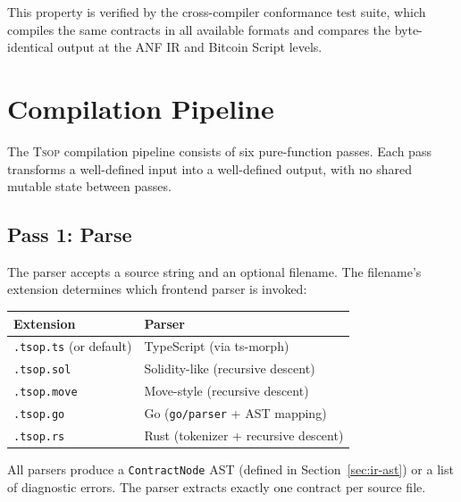\documentclass[11pt,a4paper]{article}
\newcommand{\tsop}{\textsc{Tsop}}
\begin{document}
This property is verified by the cross-compiler conformance test suite,
which compiles the same contracts in all available formats and compares
the byte-identical output at the ANF IR and Bitcoin Script levels.

\section{Compilation Pipeline}
\label{sec:pipeline}

The \tsop{} compilation pipeline consists of six pure-function passes.
Each pass transforms a well-defined input into a well-defined output,
with no shared mutable state between passes.

\subsection{Pass 1: Parse}
\label{sec:pass-parse}

The parser accepts a source string and an optional filename. The filename's
extension determines which frontend parser is invoked:

\begin{center}
\begin{tabular}{@{}ll@{}}
\toprule
\textbf{Extension} & \textbf{Parser} \\
\midrule
\texttt{.tsop.ts} (or default) & TypeScript (via ts-morph) \\
\texttt{.tsop.sol} & Solidity-like (recursive descent) \\
\texttt{.tsop.move} & Move-style (recursive descent) \\
\texttt{.tsop.go} & Go (\texttt{go/parser} + AST mapping) \\
\texttt{.tsop.rs} & Rust (tokenizer + recursive descent) \\
\bottomrule
\end{tabular}
\end{center}

All parsers produce a \texttt{ContractNode} AST (defined in
Section~\ref{sec:ir-ast}) or a list of diagnostic errors.
The parser extracts exactly one contract per source file.

\end{document}

